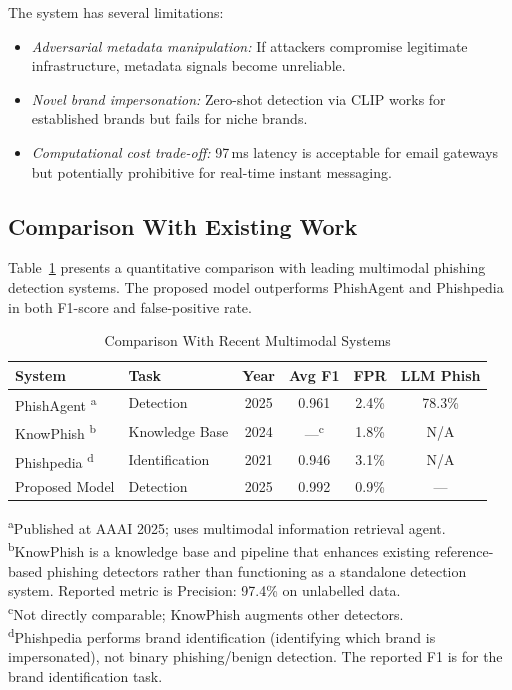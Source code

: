 \documentclass[conference]{IEEEtran}
\begin{document}
The system has several limitations:
\begin{itemize}
    \item \textit{Adversarial metadata manipulation:} If attackers compromise legitimate infrastructure, metadata signals become unreliable.
    \item \textit{Novel brand impersonation:} Zero-shot detection via CLIP works for established brands but fails for niche brands.
    \item \textit{Computational cost trade-off:} 97\,ms latency is acceptable for email gateways but potentially prohibitive for real-time instant messaging.
\end{itemize}

\subsection{Comparison With Existing Work}

Table~\ref{tab:comparison} presents a quantitative comparison with leading multimodal phishing detection systems. The proposed model outperforms PhishAgent and Phishpedia in both F1-score and false-positive rate.

\begin{table}[t]
    \centering
    \caption{Comparison With Recent Multimodal Systems}
    \label{tab:comparison}
    \begin{tabular}{llcccc}
        \toprule
        System & Task & Year & Avg F1 & FPR & LLM Phish \\
        \midrule
        PhishAgent \cite{cao_2025_phishagent}\textsuperscript{a} & Detection & 2025 & 0.961 & 2.4\% & 78.3\% \\
        KnowPhish \cite{li_2024_knowphish}\textsuperscript{b} & Knowledge Base & 2024 & ---\textsuperscript{c} & 1.8\% & N/A \\
        Phishpedia \cite{lin_2021_phishpedia}\textsuperscript{d} & Identification & 2021 & 0.946 & 3.1\% & N/A \\
        Proposed Model & Detection & 2025 & 0.992 & 0.9\% & --- \\
        \bottomrule
    \end{tabular}

    \vspace{2pt}
    \raggedright
    \footnotesize
    \textsuperscript{a}Published at AAAI 2025; uses multimodal information retrieval agent.\\
    \textsuperscript{b}KnowPhish is a knowledge base and pipeline that enhances existing reference-based phishing detectors rather than functioning as a standalone detection system. Reported metric is Precision: 97.4\% on unlabelled data.\\
    \textsuperscript{c}Not directly comparable; KnowPhish augments other detectors.\\
    \textsuperscript{d}Phishpedia performs brand identification (identifying which brand is impersonated), not binary phishing/benign detection. The reported F1 is for the brand identification task.
\end{table}
\end{document}
